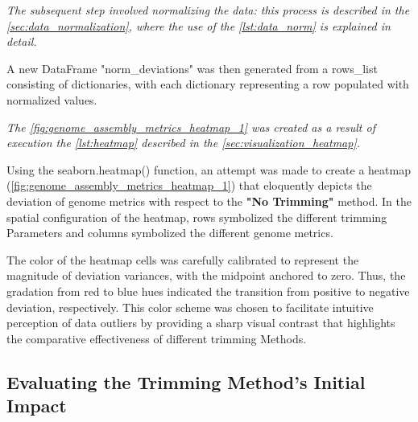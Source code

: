 \textit{The subsequent step involved normalizing the data: this process is described in the \autoref{sec:data_normalization}, where the use of the \autoref{lst:data_norm} is explained in detail.}


A new DataFrame "norm\_deviations" was then generated from a rows\_list consisting of dictionaries, with each dictionary representing a row populated with normalized values.

\textit{The \autoref{fig:genome_assembly_metrics_heatmap_1} was created as a result of execution  the \autoref{lst:heatmap} described in the \autoref{sec:visualization_heatmap}.}



Using the seaborn.heatmap() function, an attempt was made to create a \gls{heatmap} (\autoref{fig:genome_assembly_metrics_heatmap_1}) that eloquently depicts the \gls{deviation} of \gls{genome} \gls{metrics} with respect to the \textbf{"No Trimming"} method. In the spatial configuration of the \gls{heatmap}, rows symbolized the different \gls{trimming} Parameters and columns symbolized the different \gls{genome} \gls{metrics}.

The color of the \gls{heatmap} cells was carefully calibrated to represent the magnitude of \gls{deviation} variances, with the midpoint anchored to zero. Thus, the gradation from red to blue hues indicated the transition from positive to negative \gls{deviation}, respectively. This color scheme was chosen to facilitate intuitive perception of data outliers by providing a sharp visual contrast that highlights the comparative effectiveness of different \gls{trimming} Methods.





\subsection{Evaluating the Trimming Method's Initial Impact} 


